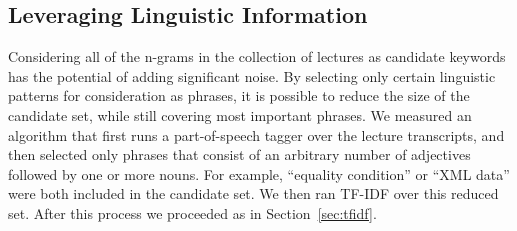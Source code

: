 \subsection{Leveraging Linguistic Information}
\label{sec:useTime}


Considering all of the n-grams in the collection of lectures as
candidate keywords has the potential of adding significant noise. By
selecting only certain linguistic patterns for consideration as
phrases, it is possible to reduce the size of the candidate set, while
still covering most important phrases. We measured an
algorithm that first runs a part-of-speech tagger over the lecture
transcripts, and then selected only phrases that consist of an
arbitrary number of adjectives followed by one or more nouns. For
example, ``equality condition'' or ``XML data'' were both included in
the candidate set. We then ran TF-IDF over this reduced set. After
this process we proceeded as in Section~\ref{sec:tfidf}.
